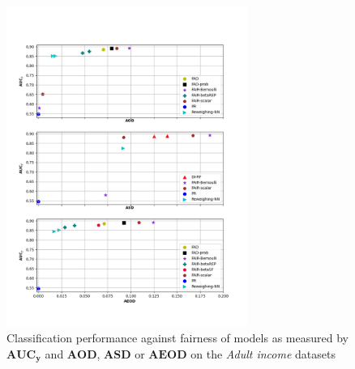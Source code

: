 \documentclass[preprint,12pt]{elsarticle}
\begin{document}
\begin{figure}
	\center
	\includegraphics[angle=0, width=0.7\textwidth]{Adult.png}
	\captionsetup{justification=centering}
	\caption{Classification performance against fairness of models as measured by $\mathbf{AUC_y}$ and $\mathbf{AOD}$, $\mathbf{ASD}$ or $\mathbf{AEOD}$ on the \textit{Adult income} datasets}
	\label{fig:Adult}
	\vskip -0.2in
\end{figure}
\end{document}
